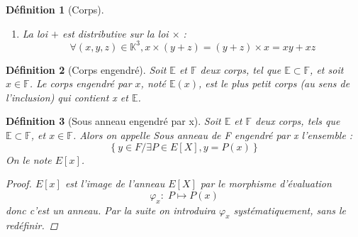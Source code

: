 \documentclass[a4paper,12pt,french]{report}
\newtheorem{definition}{Définition}[section]
\begin{document}
\begin{definition}[Corps]
\begin{enumerate}
\[\begin{array}{lll}
								\end{array}
								\right.
							\]
					\item La loi \( + \) est distributive sur la loi \( \times \) :
						\[
						\forall (x, y, z) \in \mathbb{K}^3, x \times (y + z) = (y + z) \times x = xy + xz
						\]
				\end{enumerate}
			
			\end{definition}
			
			\begin{definition}[Corps engendré]
				Soit \(\mathbb{E}\) et \(\mathbb{F}\) deux corps, tel que \(\mathbb{E} \subset \mathbb{F}\), et soit \(x \in \mathbb{F} \). Le corps engendré par \(x\), noté \(\mathbb{E}(x)\), est le plus petit corps (au sens de l'inclusion) qui contient x et \(\mathbb{E}\).
			\end{definition}
			
			\begin{definition}[Sous anneau engendré par x]
				Soit \(\mathbb{E}\) et \(\mathbb{F}\) deux corps, tels que \(\mathbb{E}\subset\mathbb{F}\), et \(x\in\mathbb{F}\). Alors on appelle \emph{Sous anneau de F engendré par x} l'ensemble :
				\[\left\{y\in F / \exists P \in E[X], y = P(x)\right\}\]
				On le note \(E[x]\).{}
				
				\begin{proof}
					\(E[x]\) est l'image de l'anneau \(E[X]\) par le morphisme d'évaluation \[\varphi_{x} : \; P \mapsto P(x) \] donc c'est un anneau. Par la suite on introduira \(\varphi_{x}\) systématiquement, sans le redéfinir.
				\end{proof}
				
			\end{definition}
			
\end{document}

